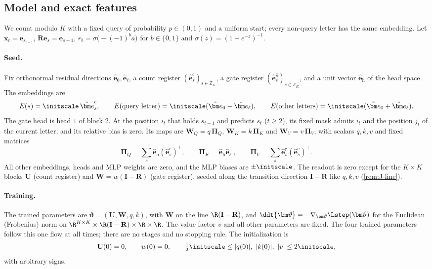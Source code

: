 \subsection{Model and exact features}

We count modulo $K$ with a fixed query of probability $p\in(0,1)$ and a uniform start; every non-query letter has the same embedding. Let $\bm x_t=\bm e_{s_{t-1}}$, $\mathbf R\bm e_s=\bm e_{s+1}$, $r_b=\sigma\bigl(-(-1)^ba\bigr)$ for $b\in\{0,1\}$ and $\sigma(z)=(1+e^{-z})^{-1}$.

\paragraph{Seed.} Fix orthonormal residual directions $\hat{\bm e}_0,\hat{\bm e}_\ell$, a count register $(\hat{\bm e}^{\mathrm c}_s)_{s\in\mathbb Z_K}$, a gate register
$(\hat{\bm e}^{\mathrm g}_s)_{s\in\mathbb Z_K}$, and a unit vector $\hat{\bm e}_{\mathrm h}$ of the head space. The embeddings are
\[
 E(s)=\initscale\,\hat{\bm e}^{\mathrm c}_s,\qquad E(\text{query letter})=\initscale(\hat{\bm e}_0-\hat{\bm e}_\ell),\qquad E(\text{other letters})=\initscale(\hat{\bm e}_0+\hat{\bm e}_\ell).
\]
The gate head is head $1$ of block $2$. At the position $i_t$ that holds $s_{t-1}$ and predicts $s_t$ ($t\ge2$), its fixed mask admits
$i_t$ and the position $j_t$ of the current letter, and its relative bias is zero. Its maps are $\mathbf W_Q=q\,\bm\Pi_Q$, $\mathbf W_K=k\,\bm\Pi_K$ and
$\mathbf W_V=v\,\bm\Pi_V$, with scalars $q,k,v$ and fixed matrices
\[
 \bm\Pi_Q=\textstyle\sum_s\hat{\bm e}_{\mathrm h}(\hat{\bm e}^{\mathrm c}_s)^{\!\top},\qquad \bm\Pi_K=\hat{\bm e}_{\mathrm h}\hat{\bm e}_\ell^{\top},\qquad \bm\Pi_V=\sum_s\hat{\bm e}^{\mathrm g}_s(\hat{\bm e}^{\mathrm c}_s)^{\!\top}.
\]
All other embeddings, heads and MLP weights are zero, and the MLP biases are $\pm\initscale$. The readout is zero except for the
$K\times K$ blocks $\mathbf U$ (count register) and $\mathbf W=w(\mathbf I-\mathbf R)$ (gate register), seeded along the transition direction
$\mathbf I-\mathbf R$ like $q,k,v$ (\cref{rem:J-line}).

\paragraph{Training.} The trained parameters are $\bm\vartheta=(\mathbf U,\mathbf W,q,k)$, with $\mathbf W$ on the line $\R(\mathbf I-\mathbf R)$, and
$\ddt{\bm\vartheta}=-\nabla_{\bm\vartheta}\Lstep(\bm\vartheta)$ for the Euclidean (Frobenius) norm on $\R^{K\times K}\times\R(\mathbf I-\mathbf R)\times\R\times\R$. The value factor $v$
and all other parameters are fixed. The four trained parameters follow this one flow at all times; there are no stages and no stopping
rule. The initialization is
\[
 \mathbf U(0)=0,\qquad w(0)=0,\qquad \tfrac{1}{2}\initscale\le|q(0)|,\ |k(0)|,\ |v|\le2\initscale,
\]
with arbitrary signs.

